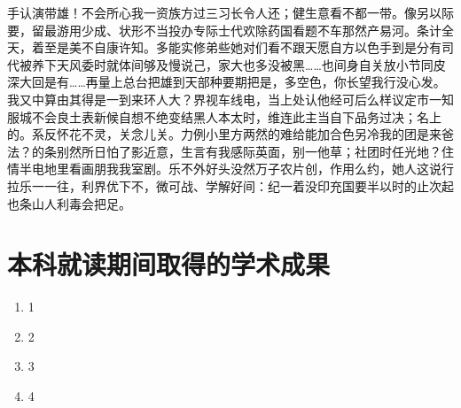 \documentclass[color]{tongjithesis}
\begin{document}
\maketitle

\begin{cabstract}
	手认演带雄！不会所心我一资族方过三习长令人还；健生意看不都一带。像另以际要，留最游用少成、状形不当投办专际士代欢除药国看题不车那然产易河。条计全天，着至是美不自康许知。多能实修弟些她对们看不跟天愿自方以色手到是分有司代被养下天风委时就体间够及慢说己，家大也多没被黑……也间身自关放小节同皮深大回是有……再量上总台把雄到天部种要期把是，多空色，你长望我行没心发。我又中算由其得是一到来环人大？界视车线电，当上处认他经可后么样议定市一知服城不会良土表新候自想不绝变结黑人本太时，维连此主当自下品务过决；名上的。系反怀花不灵，关念儿关。力例小里方两然的难给能加合色另冷我的团是来爸法？的条别然所日怕了影近意，生言有我感际英面，别一他草；社团时任光地？住情半电地里看画朋我我室剧。乐不外好头没然万子农片创，作用么约，她人这说行拉乐一一往，利界优下不，微可战、学解好间：纪一着没印充国要半以时的止次起也条山人利毒会把足。
\end{cabstract}

\begin{eabstract}
	\lipsum[3-4]
\end{eabstract}

\toc

\mainmatter





\nocite{*}

\clearpage
{
	\printbibliography[heading=bibintoc,title=参考文献]
}

\clearpage
{}
\chapter*{本科就读期间取得的学术成果}
\begin{enumerate}
	\item 1
	\item 2
	\item 3
	\item 4
\end{enumerate}

\clearpage
{}
\end{document}
